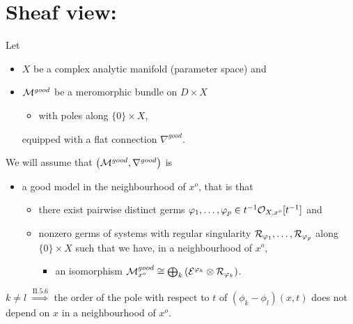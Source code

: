 \section{Sheaf view: \cite{sabbah2007isomonodromic}} %
Let
\begin{itemize}
  \item $X$ be a complex analytic manifold
    (\textcolor{green!40!black}{parameter space}) and
  \item $\mathcal{M}^{good}$ be a meromorphic bundle on $D\times X$
    \begin{itemize}
      \item with poles along $\{0\}\times X$,
    \end{itemize}
    equipped with a flat connection $\nabla^{good}$.
\end{itemize}
We will assume that $\left(\mathcal{M}^{good},\nabla^{good}\right)$ is 
\begin{itemize}
  \item a good model in the neighbourhood of $x^o$, that is that
    \begin{itemize}
      \item there exist pairwise distinct germs $\varphi_1,\dots,\varphi_p\in
        t^{-1}\mathcal{O}_{X,x^o}[t^{-1}]$ and
      \item nonzero germs of systems with regular singularity
        $\mathcal{R}_{\varphi_1},\dots,\mathcal{R}_{\varphi_p}$ along $\{0\}\times X$ such that
            we have, in a neighbourhood of $x^o$,
        \begin{itemize}
          \item an isomorphism $\mathcal{M}_{x^o}^{good}
            \cong\bigoplus_k\left(\mathcal{E}^{\varphi_k}\otimes\mathcal{R}_{\varphi_k}\right)$.
        \end{itemize}
    \end{itemize}
\end{itemize}
$k\neq l$ $\overset{\text{II.5.6}}{\Rightarrow{}}$ the order of the pole with
respect to $t$ of $(\phi_k-\phi_l)(x,t)$ does not depend on $x$ in a
neighbourhood of $x^o$.
